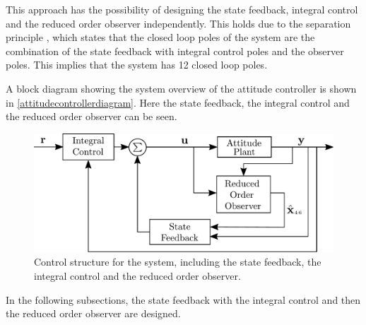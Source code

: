 This approach has the possibility of designing the state feedback, integral control and the reduced order observer independently. This holds due to the separation principle \cite{ObserverChristoffer}, which states that the closed loop poles of the system are the combination of the state feedback with integral control poles and the observer poles. This implies that the system has 12 closed loop poles.%

A block diagram showing the system overview of the attitude controller is shown in \autoref{attitudecontrollerdiagram}. Here the state feedback, the integral control and the reduced order observer can be seen.
\begin{figure}[H]
	\includegraphics[scale=.45]{figures/AttitudeControlDiagram}
	\centering
	\caption{Control structure for the system, including the state feedback, the integral control and the reduced order observer.}
	\label{attitudecontrollerdiagram}
\end{figure}

In the following subsections, the state feedback with the integral control and then the reduced order observer are designed.

%
%